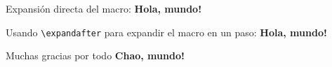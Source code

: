 

Expansión directa del macro: \textbf{Hola, mundo!}

Usando \texttt{\textbackslash expandafter} para expandir el macro en un paso: \expandafter\textbf{Hola, mundo!}

Muchas gracias por todo \textbf{Chao, mundo!}

